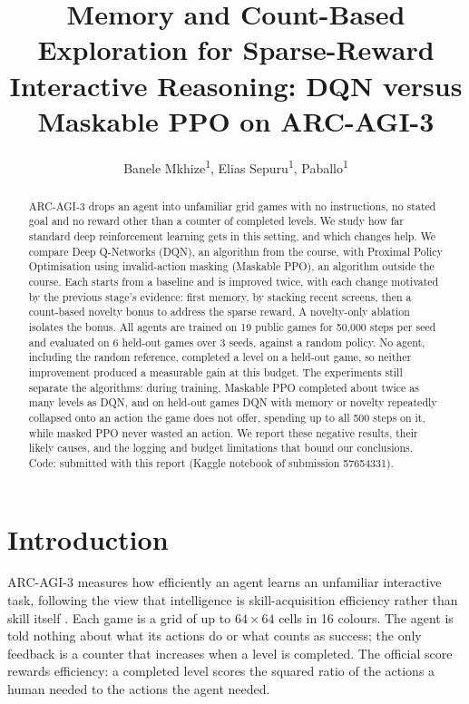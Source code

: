 \documentclass[10pt]{article}
\title{Memory and Count-Based Exploration for Sparse-Reward Interactive Reasoning: DQN versus Maskable PPO on ARC-AGI-3}
\author{Banele Mkhize\textsuperscript{1}, Elias Sepuru\textsuperscript{1}, Paballo\textsuperscript{1}}
\begin{document}
\maketitle

\begin{abstract}
ARC-AGI-3 drops an agent into unfamiliar grid games with no instructions, no stated goal and no reward other than a counter of completed levels. We study how far standard deep reinforcement learning gets in this setting, and which changes help. We compare Deep Q-Networks (DQN), an algorithm from the course, with Proximal Policy Optimisation using invalid-action masking (Maskable PPO), an algorithm outside the course. Each starts from a baseline and is improved twice, with each change motivated by the previous stage's evidence: first memory, by stacking recent screens, then a count-based novelty bonus to address the sparse reward. A novelty-only ablation isolates the bonus. All agents are trained on 19 public games for 50,000 steps per seed and evaluated on 6 held-out games over 3 seeds, against a random policy. No agent, including the random reference, completed a level on a held-out game, so neither improvement produced a measurable gain at this budget. The experiments still separate the algorithms: during training, Maskable PPO completed about twice as many levels as DQN, and on held-out games DQN with memory or novelty repeatedly collapsed onto an action the game does not offer, spending up to all 500 steps on it, while masked PPO never wasted an action. We report these negative results, their likely causes, and the logging and budget limitations that bound our conclusions. Code: submitted with this report (Kaggle notebook of submission 57654331).
\end{abstract}

\section{Introduction}
\label{sec:introduction}

ARC-AGI-3 \citep{arcprize2026} measures how efficiently an agent learns an unfamiliar interactive task, following the view that intelligence is skill-acquisition efficiency rather than skill itself \citep{chollet2019measure}. Each game is a grid of up to $64\times 64$ cells in 16 colours. The agent is told nothing about what its actions do or what counts as success; the only feedback is a counter that increases when a level is completed. The official score rewards efficiency: a completed level scores the squared ratio of the actions a human needed to the actions the agent needed.
\end{document}
